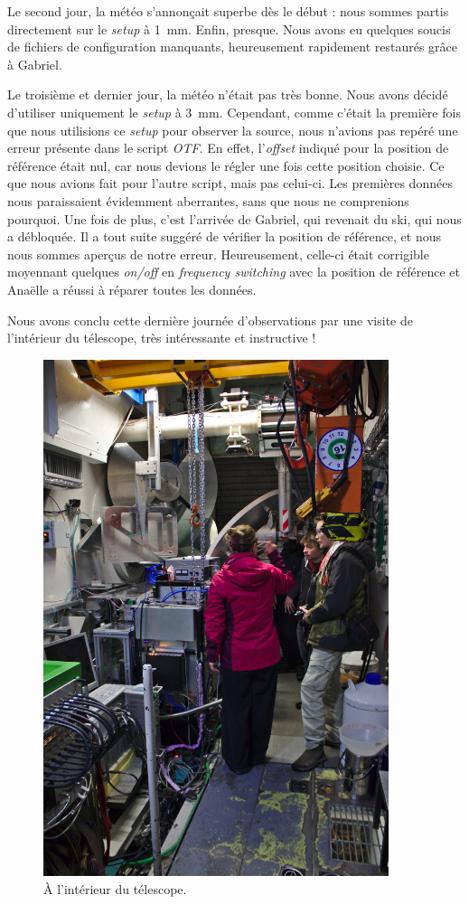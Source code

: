\documentclass[a4paper,10pt,french]{article}
\newcommand{\setup}{\textit{setup}}
\newcommand{\troismm}{\SI{3}{\milli\meter}}
\newcommand{\unmm}{\SI{1}{\milli\meter}}
\begin{document}
Le second jour, la météo s’annonçait superbe dès le début : nous sommes partis
directement sur le \setup{} à \unmm. Enfin, presque. Nous avons eu quelques
soucis de fichiers de configuration manquants, heureusement rapidement
restaurés grâce à Gabriel.

Le troisième et dernier jour, la météo n’était pas très bonne. Nous avons
décidé d’utiliser uniquement le \setup{} à \troismm. Cependant, comme c’était
la première fois que nous utilisions ce \setup{} pour observer la source, nous
n’avions pas repéré une erreur présente dans le script \textit{OTF}. En effet,
l’\textit{offset} indiqué pour la position de référence était nul, car nous
devions le régler une fois cette position choisie. Ce que nous avions fait pour
l’autre script, mais pas celui-ci. Les premières données nous paraissaient
évidemment aberrantes, sans que nous ne comprenions pourquoi. Une fois de plus,
c’est l’arrivée de Gabriel, qui revenait du ski, qui nous a débloquée. Il a
tout suite suggéré de vérifier la position de référence, et nous nous sommes
aperçus de notre erreur. Heureusement, celle-ci était corrigible moyennant
quelques \textit{on/off} en \textit{frequency switching} avec la position de
référence et Anaëlle a réussi à réparer toutes les données.

Nous avons conclu cette dernière journée d’observations par une visite de
l’intérieur du télescope, très intéressante et instructive !

\begin{figure}[ht]
    \centering
    \includegraphics[width=0.9\textwidth]{inside.jpg}
    \caption{À l’intérieur du télescope.}
\end{figure}
\end{document}
